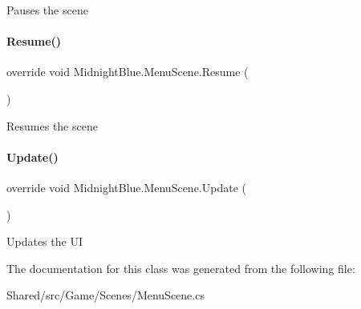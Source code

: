 Pauses the scene 

\hypertarget{class_midnight_blue_1_1_menu_scene_a76f8bd3add4abf16ac9962a2fb51fad2}{}\label{class_midnight_blue_1_1_menu_scene_a76f8bd3add4abf16ac9962a2fb51fad2} 
\paragraph{\texorpdfstring{Resume()}{Resume()}}
{\footnotesize\ttfamily override void Midnight\+Blue.\+Menu\+Scene.\+Resume (\begin{DoxyParamCaption}{ }\end{DoxyParamCaption})\hspace{0.3cm}{\ttfamily [inline]}}



Resumes the scene 

\hypertarget{class_midnight_blue_1_1_menu_scene_af82ad49ba2744422e52fc6c1b8544255}{}\label{class_midnight_blue_1_1_menu_scene_af82ad49ba2744422e52fc6c1b8544255} 
\paragraph{\texorpdfstring{Update()}{Update()}}
{\footnotesize\ttfamily override void Midnight\+Blue.\+Menu\+Scene.\+Update (\begin{DoxyParamCaption}{ }\end{DoxyParamCaption})\hspace{0.3cm}{\ttfamily [inline]}}



Updates the UI 



The documentation for this class was generated from the following file\+:\begin{DoxyCompactItemize}
\item 
Shared/src/\+Game/\+Scenes/Menu\+Scene.\+cs\end{DoxyCompactItemize}
